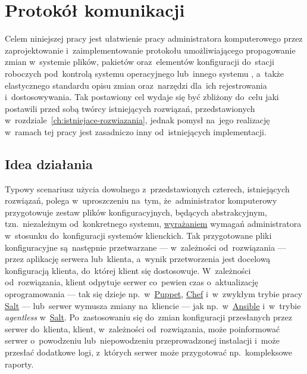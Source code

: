 \documentclass[thesis]{subfiles}
\begin{document}
\chapter{Protokół komunikacji}
\label{ch:protokol}

Celem niniejszej pracy jest ułatwienie pracy administratora komputerowego przez zaprojektowanie i~zaimplementowanie protokołu umożliwiającego propagowanie zmian w~systemie plików, pakietów oraz~elementów konfiguracji do~stacji roboczych pod~kontrolą systemu operacyjnego  lub~innego systemu , a~także elastycznego standardu opisu zmian oraz~narzędzi dla~ich rejestrowania i~dostosowywania. Tak postawiony cel wydaje się być zbliżony do~celu jaki postawili przed sobą twórcy istniejących rozwiązań, przedstawionych w~rozdziale~\ref{ch:istniejace-rozwiazania}, jednak pomysł na~jego realizację w~ramach tej pracy jest zasadniczo inny od~istniejących implementacji.


\section{Idea działania}

Typowy scenariusz użycia dowolnego z~przedstawionych czterech, istniejących rozwiązań, polega w~uproszczeniu na~tym, że~administrator komputerowy przygotowuje zestaw plików konfiguracyjnych, będących abstrakcyjnym, tzn.~niezależnym od~konkretnego systemu, \href{https://martinfowler.com/bliki/DomainSpecificLanguage.html}{wyrażaniem} wymagań administratora w~stosunku do~konfiguracji systemów klienckich. Tak przygotowane pliki konfiguracyjne są~następnie przetwarzane --- w~zależności od~rozwiązania --- przez aplikację serwera lub~klienta, a~wynik przetworzenia jest docelową konfiguracją klienta, do~której klient się dostosowuje. W~zależności od~rozwiązania, klient odpytuje serwer co~pewien czas o~aktualizację oprogramowania --- tak się dzieje np.~w~\hyperref[sec:puppet]{Puppet}, \hyperref[sec:chef]{Chef} i~w~zwykłym trybie pracy \hyperref[sec:salt]{Salt} --- lub~serwer wymusza zmiany na~kliencie --- jak np.~w~\hyperref[sec:ansible]{Ansible} i~w~trybie \emph{agentless} w~\hyperref[sec:salt]{Salt}. Po~zastosowaniu się do~zmian konfiguracji przesłanych przez serwer do~klienta, klient, w~zależności od~rozwiązania, może poinformować serwer o~powodzeniu lub~niepowodzeniu przeprowadzonej instalacji i~może przesłać dodatkowe logi, z~których serwer może przygotować np.~kompleksowe raporty.
\end{document}
